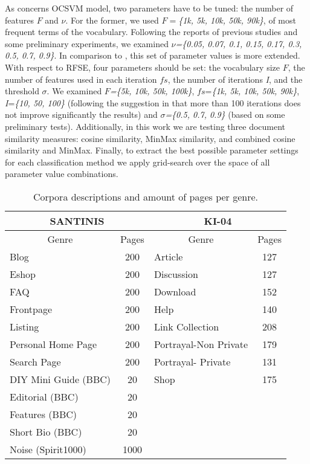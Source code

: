 \documentclass[runningheads]{llncs}
\begin{document}
As concerns OCSVM model, two parameters have to be tuned: the number of features $F$ and $\nu$. For the former, we used $F=$\textit{\{1k, 5k, 10k, 50k, 90k\}}, of most frequent terms of the vocabulary. Following the reports of previous studies \citep{scholkopf1999estimating} and some preliminary experiments, we examined $\nu$\textit{=\{0.05, 0.07, 0.1, 0.15, 0.17, 0.3, 0.5, 0.7, 0.9\}}. In comparison to \citep{pritsos2013open}, this set of parameter values is more extended. With respect to RFSE, four parameters should be set: the vocabulary size $F$, the number of features used in each iteration $fs$, the number of iterations \textit{I}, and the threshold $\sigma$. We examined $F$\textit{=\{5k, 10k, 50k, 100k\}}, $fs$=\textit{\{1k, 5k, 10k, 50k, 90k\}}, \textit{I}=\textit{\{10, 50, 100\}} (following the suggestion in \citep{koppel2011authorship} that more than 100 iterations does not improve significantly the results) and $\sigma$\textit{=\{0.5, 0.7, 0.9\}} (based on some preliminary tests). Additionally, in this work we are testing three document similarity measures: cosine similarity, MinMax similarity,  and combined cosine similarity and MinMax. Finally, to extract the best possible parameter settings for each classification method we apply grid-search over the space of all parameter value combinations.

\begin{table}
\center
\begin{tabular}{|l|l|l|l|}
\hline
\multicolumn{2}{|c|}{SANTINIS} & \multicolumn{2}{c|}{KI-04}\tabularnewline
\hline
\multicolumn{1}{|c|}{Genre} & \multicolumn{1}{c|}{Pages} & \multicolumn{1}{c|}{Genre} & \multicolumn{1}{c|}{Pages}\tabularnewline
\hline
\multicolumn{1}{|l|}{Blog} & \multicolumn{1}{c|}{200} & \multicolumn{1}{l|}{Article} & \multicolumn{1}{c|}{127}\tabularnewline
\multicolumn{1}{|l|}{Eshop} & \multicolumn{1}{c|}{200} & \multicolumn{1}{l|}{Discussion} & \multicolumn{1}{c|}{127}\tabularnewline
\multicolumn{1}{|l|}{FAQ} & \multicolumn{1}{c|}{200} & \multicolumn{1}{l|}{Download} & \multicolumn{1}{c|}{152}\tabularnewline
\multicolumn{1}{|l|}{Frontpage} & \multicolumn{1}{c|}{200} & \multicolumn{1}{l|}{Help} & \multicolumn{1}{c|}{140}\tabularnewline
\multicolumn{1}{|l|}{Listing} & \multicolumn{1}{c|}{200} & \multicolumn{1}{l|}{Link Collection} & \multicolumn{1}{c|}{208}\tabularnewline
\multicolumn{1}{|l|}{Personal Home Page} & \multicolumn{1}{c|}{200} & \multicolumn{1}{l|}{Portrayal-Non Private} & \multicolumn{1}{c|}{179}\tabularnewline
\multicolumn{1}{|l|}{Search Page} & \multicolumn{1}{c|}{200} & \multicolumn{1}{l|}{Portrayal- Private} & \multicolumn{1}{c|}{131}\tabularnewline
\multicolumn{1}{|l|}{DIY Mini Guide (BBC)} & \multicolumn{1}{c|}{20} & \multicolumn{1}{l|}{Shop} & \multicolumn{1}{c|}{175}\tabularnewline
\multicolumn{1}{|l|}{Editorial (BBC)} & \multicolumn{1}{c|}{20} &  & \tabularnewline
\multicolumn{1}{|l|}{Features (BBC)} & \multicolumn{1}{c|}{20} &  & \tabularnewline
\multicolumn{1}{|l|}{Short Bio (BBC)} & \multicolumn{1}{c|}{20} &  & \tabularnewline
\multicolumn{1}{|l|}{Noise (Spirit1000)} & \multicolumn{1}{c|}{1000} &  & \tabularnewline
\hline
\end{tabular}
\caption {Corpora descriptions and amount of pages per genre.}
\label{tbl:genre_tags}
\end{table}
\end{document}
